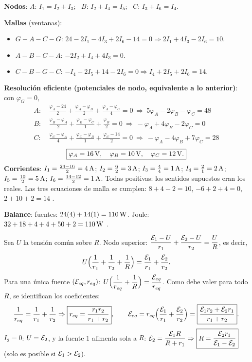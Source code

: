 \textbf{Nodos}: $A$: $I_1=I_2+I_3$; \ $B$: $I_2+I_4=I_5$; \ $C$: $I_3+I_6=I_4$.

\textbf{Mallas} (ventanas):
\begin{itemize}
\item $G\!-\!A\!-\!C\!-\!G$: $24-2I_1-4I_3+2I_6-14=0\Rightarrow2I_1+4I_3-2I_6=10$.
\item $A\!-\!B\!-\!C\!-\!A$: $-2I_2+I_4+4I_3=0$.
\item $C\!-\!B\!-\!G\!-\!C$: $-I_4-2I_5+14-2I_6=0\Rightarrow I_4+2I_5+2I_6=14$.
\end{itemize}
\textbf{Resolución eficiente (potenciales de nodo, equivalente a lo anterior)}: con $\varphi_G=0$,
\[
\begin{aligned}
A:&\ \tfrac{\varphi_A-24}{2}+\tfrac{\varphi_A-\varphi_B}{2}+\tfrac{\varphi_A-\varphi_C}{4}=0\ \Rightarrow\ 5\varphi_A-2\varphi_B-\varphi_C=48\\
B:&\ \tfrac{\varphi_B-\varphi_A}{2}+\tfrac{\varphi_B-\varphi_C}{1}+\tfrac{\varphi_B}{2}=0\ \Rightarrow\ -\varphi_A+4\varphi_B-2\varphi_C=0\\
C:&\ \tfrac{\varphi_C-\varphi_A}{4}+\tfrac{\varphi_C-\varphi_B}{1}+\tfrac{\varphi_C-14}{2}=0\ \Rightarrow\ -\varphi_A-4\varphi_B+7\varphi_C=28
\end{aligned}
\]
\[
\boxed{\varphi_A=16\,\mathrm{V},\quad\varphi_B=10\,\mathrm{V},\quad\varphi_C=12\,\mathrm{V}.}
\]
\textbf{Corrientes}: $I_1=\frac{24-16}{2}=4\,\mathrm{A}$; $I_2=\frac{6}{2}=3\,\mathrm{A}$; $I_3=\frac44=1\,\mathrm{A}$; $I_4=\frac21=2\,\mathrm{A}$; $I_5=\frac{10}{2}=5\,\mathrm{A}$; $I_6=\frac{14-12}{2}=1\,\mathrm{A}$. Todas positivas: los sentidos supuestos eran los reales. Las tres ecuaciones de malla se cumplen: $8+4-2=10$, $-6+2+4=0$, $2+10+2=14$ \checkmark.

\textbf{Balance}: fuentes: $24(4)+14(1)=110\,\mathrm{W}$. Joule: $32+18+4+4+50+2=110\,\mathrm{W}$ \checkmark.

Sea $U$ la tensión común sobre $R$. Nodo superior: $\dfrac{\mathcal{E}_1-U}{r_1}+\dfrac{\mathcal{E}_2-U}{r_2}=\dfrac UR$, es decir,
\[
U\Big(\frac1{r_1}+\frac1{r_2}+\frac1R\Big)=\frac{\mathcal{E}_1}{r_1}+\frac{\mathcal{E}_2}{r_2}.
\]
Para una única fuente $(\mathcal{E}_{eq},r_{eq})$: $U\Big(\dfrac1{r_{eq}}+\dfrac1R\Big)=\dfrac{\mathcal{E}_{eq}}{r_{eq}}$. Como debe valer para todo $R$, se identifican los coeficientes:
\[
\frac1{r_{eq}}=\frac1{r_1}+\frac1{r_2}\Rightarrow\boxed{r_{eq}=\frac{r_1r_2}{r_1+r_2}},\qquad\mathcal{E}_{eq}=r_{eq}\Big(\frac{\mathcal{E}_1}{r_1}+\frac{\mathcal{E}_2}{r_2}\Big)=\boxed{\frac{\mathcal{E}_1r_2+\mathcal{E}_2r_1}{r_1+r_2}}.
\]
\textbf{$I_2=0$}: $U=\mathcal{E}_2$, y la fuente 1 alimenta sola a $R$: $\mathcal{E}_2=\dfrac{\mathcal{E}_1R}{R+r_1}\Rightarrow\boxed{R=\dfrac{\mathcal{E}_2r_1}{\mathcal{E}_1-\mathcal{E}_2}}$ (solo es posible si $\mathcal{E}_1>\mathcal{E}_2$).

